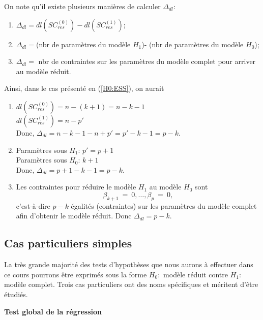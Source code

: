 
On note qu'il existe plusieurs manières de calculer $\Delta_{dl}$:
\begin{enumerate}\item
$\Delta_{dl}=dl(SC_{res}^{(0)})-dl(SC_{res}^{(1)})$;
\item $\Delta_{dl}=$(nbr de paramètres du mod\`ele $H_1$)-
(nbr de paramètres du modèle $H_0$);
\item $\Delta_{dl}=$ nbr de contraintes sur les param\`etres du mod\`ele complet pour
arriver au mod\`ele réduit.
\end{enumerate}
Ainsi, dans le cas présenté en (\ref{H0:ESS}), on aurait
\begin{enumerate}
\item $dl(SC_{res}^{(0)})=n-(k+1)=n-k-1$\\
$dl(SC_{res}^{(1)})=n-p'$\\
Donc, $\Delta_{dl}=n-k-1-n+p'=p'-k-1=p-k$.
\item Param\`etres sous $H_1$: $p'=p+1$\\
Param\`etres sous $H_0$: $k+1$\\
Donc, $\Delta_{dl}=p+1-k-1=p-k$.
\item Les contraintes pour réduire le mod\`ele $H_1$ au mod\`ele $H_0$ sont
$$\beta_{k+1}~=~0,\ldots, \beta_{p}~=~0,$$ c'est-à-dire $p-k$ égalités (contraintes) sur les param\`etres du mod\`ele complet afin d'obtenir le mod\`ele réduit. Donc $\Delta_{dl}=p-k$.
\end{enumerate}

\subsection{Cas particuliers simples}

La très grande majorité des tests d'hypothèses que nous aurons à effectuer dans ce cours
pourrons \^etre exprimés sous la forme $H_0:$ mod\`ele réduit contre $H_1:$ mod\`ele complet. Trois cas particuliers ont des noms spécifiques et méritent d'être étudiés.

\textbf{Test global de la régression}

